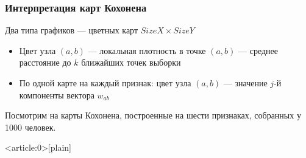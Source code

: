 \documentclass[fullscreen=true, bookmarks=true, hyperref={pdfencoding=unicode}]{beamer}
\begin{document}
\begin{frame}
  \frametitle{Интерпретация карт Кохонена}

  Два типа графиков — цветных карт $SizeX \times SizeY$

  \begin{itemize}
    \item Цвет узла $(a, b)$ — локальная плотность в точке $(a, b)$ — среднее расстояние до $k$ ближайших точек выборки
    \item По одной карте на каждый признак: цвет узла $(a, b)$ — значение $j$-й компоненты вектора $w_{ab}$
  \end{itemize}
  \vspace{1cm}
  Посмотрим на карты Кохонена, построенные на шести признаках, собранных у 1000 человек.
\end{frame}

{ %
    \begin{frame}<article:0>[plain]
     \end{frame}
}
\end{document}
